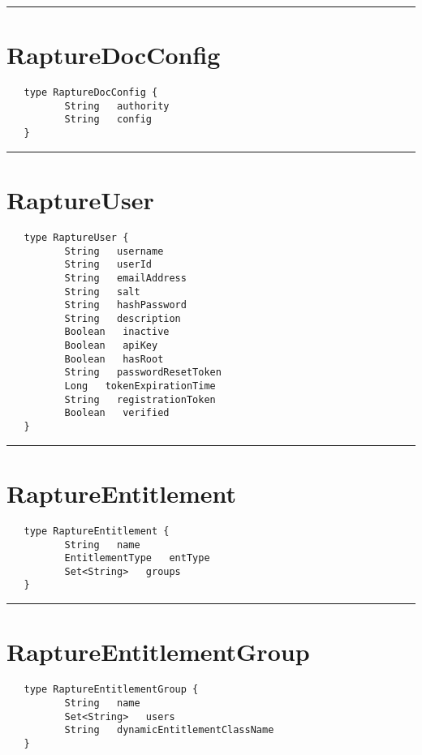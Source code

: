 \rule{12cm}{2pt}
\section{RaptureDocConfig}
\label{type:RaptureDocConfig}

\begin{Verbatim}
   type RaptureDocConfig {
          String   authority
          String   config
   }
\end{Verbatim}

\rule{12cm}{2pt}
\section{RaptureUser}
\label{type:RaptureUser}

\begin{Verbatim}
   type RaptureUser {
          String   username
          String   userId
          String   emailAddress
          String   salt
          String   hashPassword
          String   description
          Boolean   inactive
          Boolean   apiKey
          Boolean   hasRoot
          String   passwordResetToken
          Long   tokenExpirationTime
          String   registrationToken
          Boolean   verified
   }
\end{Verbatim}

\rule{12cm}{2pt}
\section{RaptureEntitlement}
\label{type:RaptureEntitlement}

\begin{Verbatim}
   type RaptureEntitlement {
          String   name
          EntitlementType   entType
          Set<String>   groups
   }
\end{Verbatim}

\rule{12cm}{2pt}
\section{RaptureEntitlementGroup}
\label{type:RaptureEntitlementGroup}

\begin{Verbatim}
   type RaptureEntitlementGroup {
          String   name
          Set<String>   users
          String   dynamicEntitlementClassName
   }
\end{Verbatim}

